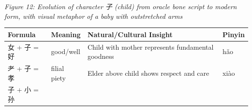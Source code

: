 \emph{Figure 12: Evolution of character 子 (child) from oracle bone
script to modern form, with visual metaphor of a baby with outstretched
arms}

\begin{longtable}[]{@{}llll@{}}
\toprule
\begin{minipage}[b]{0.15\columnwidth}\raggedright
Formula\strut
\end{minipage} & \begin{minipage}[b]{0.15\columnwidth}\raggedright
Meaning\strut
\end{minipage} & \begin{minipage}[b]{0.43\columnwidth}\raggedright
Natural/Cultural Insight\strut
\end{minipage} & \begin{minipage}[b]{0.15\columnwidth}\raggedright
Pinyin\strut
\end{minipage}\tabularnewline
\midrule
\endhead
\begin{minipage}[t]{0.15\columnwidth}\raggedright
女 + 子 = 好\strut
\end{minipage} & \begin{minipage}[t]{0.15\columnwidth}\raggedright
good/well\strut
\end{minipage} & \begin{minipage}[t]{0.43\columnwidth}\raggedright
Child with mother represents fundamental goodness\strut
\end{minipage} & \begin{minipage}[t]{0.15\columnwidth}\raggedright
hǎo\strut
\end{minipage}\tabularnewline
\begin{minipage}[t]{0.15\columnwidth}\raggedright
耂 + 子 = 孝\strut
\end{minipage} & \begin{minipage}[t]{0.15\columnwidth}\raggedright
filial piety\strut
\end{minipage} & \begin{minipage}[t]{0.43\columnwidth}\raggedright
Elder above child shows respect and care\strut
\end{minipage} & \begin{minipage}[t]{0.15\columnwidth}\raggedright
xiào\strut
\end{minipage}\tabularnewline
\begin{minipage}[t]{0.15\columnwidth}\raggedright
子 + 小 = 孙\strut
\end{minipage} & \begin{minipage}[t]{0.15\columnwidth}\raggedright

\end{minipage}
\end{longtable}
